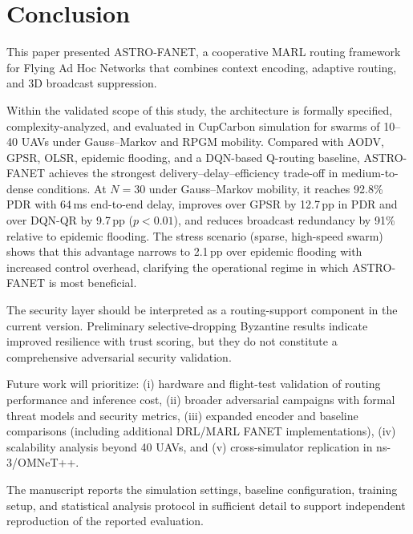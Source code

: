 \documentclass[5p,times]{elsarticle}
\begin{document}
\section{Conclusion}
\label{sec:conclusion}

This paper presented ASTRO-FANET, a cooperative MARL routing framework for Flying Ad Hoc Networks that combines context encoding, adaptive routing, and 3D broadcast suppression.

Within the validated scope of this study, the architecture is formally specified, complexity-analyzed, and evaluated in CupCarbon simulation for swarms of 10--40 UAVs under Gauss--Markov and RPGM mobility. Compared with AODV, GPSR, OLSR, epidemic flooding, and a DQN-based Q-routing baseline, ASTRO-FANET achieves the strongest delivery--delay--efficiency trade-off in medium-to-dense conditions. At $N=30$ under Gauss--Markov mobility, it reaches 92.8\% PDR with 64\,ms end-to-end delay, improves over GPSR by 12.7\,pp in PDR and over DQN-QR by 9.7\,pp ($p < 0.01$), and reduces broadcast redundancy by 91\% relative to epidemic flooding. The stress scenario (sparse, high-speed swarm) shows that this advantage narrows to 2.1\,pp over epidemic flooding with increased control overhead, clarifying the operational regime in which ASTRO-FANET is most beneficial.

The security layer should be interpreted as a routing-support component in the current version. Preliminary selective-dropping Byzantine results indicate improved resilience with trust scoring, but they do not constitute a comprehensive adversarial security validation.

Future work will prioritize: (i) hardware and flight-test validation of routing performance and inference cost, (ii) broader adversarial campaigns with formal threat models and security metrics, (iii) expanded encoder and baseline comparisons (including additional DRL/MARL FANET implementations), (iv) scalability analysis beyond 40 UAVs, and (v) cross-simulator replication in ns-3/OMNeT++.

The manuscript reports the simulation settings, baseline configuration, training setup, and statistical analysis protocol in sufficient detail to support independent reproduction of the reported evaluation.



\end{document}
